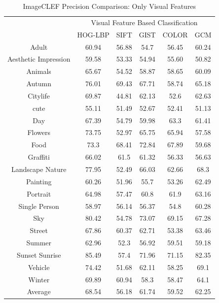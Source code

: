 \begin{table}
\centering
\caption{ ImageCLEF Precision Comparison: Only Visual Features} %
\vspace*{0.2 cm}
\begin{tabular}{| c | c | c | c | c | c |}
\hline
 {\multirow{2}{*}{Labels}} & \multicolumn{5}{|c|}{Visual Feature Based Classification} \\
 \cline{2-6}
 & HOG-LBP & SIFT & GIST & COLOR & GCM \\  [1ex] \hline
Adult & 60.94 & 56.88 & 54.7 & 56.45 & 60.24 \\  [1ex] \hline
Aesthetic Impression & 59.58 & 53.33 & 54.94 & 55.60 & 50.82 \\  [1ex] \hline
Animals & 65.67 & 54.52 & 58.87 & 58.65 & 60.09 \\  [1ex] \hline
Autumn & 76.01 & 69.43 & 67.71 & 58.74 & 65.18 \\  [1ex] \hline
Citylife & 69.87 & 44.81 & 62.13 & 52.6 & 62.63 \\  [1ex] \hline
cute & 55.11 & 51.49 & 52.67 & 52.41 & 51.13 \\  [1ex] \hline
Day & 67.39 & 54.79 & 59.98 & 63.3 & 61.41 \\  [1ex] \hline
Flowers & 73.75 & 52.97 & 65.75 & 65.94 & 57.58 \\  [1ex] \hline
Food & 73.3 & 68.41 & 72.84 & 67.89 & 59.68 \\  [1ex] \hline
Graffiti & 66.02 & 61.5 & 61.32 & 56.33 & 56.63 \\  [1ex] \hline
Landscape Nature & 77.95 & 52.49 & 66.03 & 62.66 & 68.3 \\  [1ex] \hline
Painting & 60.26 & 51.96 & 55.7 & 53.26 & 62.49 \\  [1ex] \hline
Portrait & 64.98 & 57.47 & 60.8 & 61.9 & 63.16 \\  [1ex] \hline
Single Person & 58.97 & 56.14 & 56.37 & 54.8 & 60.28 \\  [1ex] \hline
Sky & 80.42 & 54.78 & 73.07 & 69.15 & 67.28 \\  [1ex] \hline
Street & 67.86 & 60.37 & 62.71 & 53.38 & 63.46 \\  [1ex] \hline
Summer & 62.96 & 52.3 & 56.92 & 59.51 & 59.18 \\  [1ex] \hline
Sunset Sunrise & 85.49 & 57.4 & 71.96 & 71.15 & 82.35 \\  [1ex] \hline
Vehicle & 74.42 & 51.68 & 62.11 & 58.25 & 69.1 \\  [1ex] \hline
Winter & 69.89 & 60.94 & 58.3 & 58.47 & 64.1 \\  [1ex] \hline
Average & 68.54 & 56.18 & 61.74 & 59.52 & 62.25 \\  [1ex] \hline
\end{tabular}
\label{ImageCLEFPrecisionVisual} %
\end{table}

